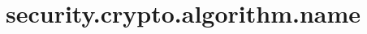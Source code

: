 \section{security.crypto.algorithm.name}
\label{configuration:SecurityCryptoAlgorithmName}
\AvailableInJavaOnly{\TODO}